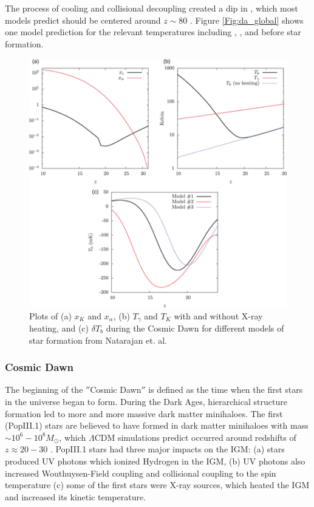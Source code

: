 The process of cooling and collisional decoupling created a dip in \ts, which most models predict should be centered around $z \sim 80 $ \cite{furlanetto_2006}. Figure \ref{Fig:da_global} shows one model prediction for the relevant temperatures including \tg, \tk, \ts and \dtb before star formation. 

\begin{figure}[htb]
\begin{center}
\includegraphics[width=0.95\linewidth]{Introduction/figures/ts_evolution.png}
\caption{Plots of (a) $x_K$ and $x_{\alpha}$, (b) $T_\gamma$ and $T_K$ with and without X-ray heating, and (c) $\delta T_b$ during the Cosmic Dawn for different models of star formation from Natarajan et. al. \cite{natarajan_2014}}
\label{Fig:cd_global}
\end{center}
\end{figure}

\subsubsection{Cosmic Dawn}

The beginning of the $''$Cosmic Dawn$''$ is defined as the time when the first stars in the universe began to form. During the Dark Ages, hierarchical structure formation led to more and more massive dark matter minihaloes. The first (PopIII.1) stars are believed to have formed in dark matter minihaloes with mass $\sim 10^6 - 10^8 M_{\odot}$, which $\Lambda$CDM simulations predict occurred around redshifts of $z \approx 20-30$ \cite{bromm_2013}. PopIII.1 stars had three major impacts on the IGM: (a) stars produced UV photons which ionized Hydrogen in the IGM, (b) UV photons also increased Wouthuysen-Field coupling and collisional coupling to the spin temperature (c) some of the first stars were X-ray sources, which heated the IGM and increased its kinetic temperature.

